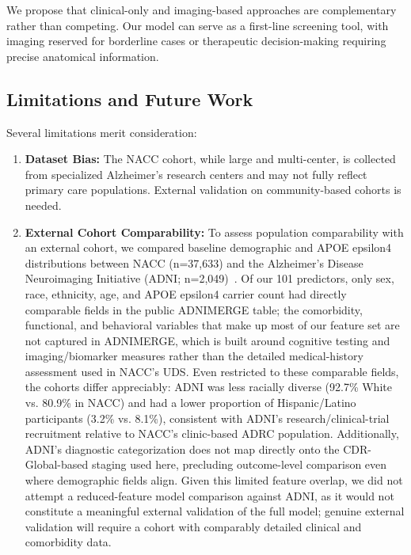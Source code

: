 \documentclass[preprint,12pt]{elsarticle}
\begin{document}
We propose that clinical-only and imaging-based approaches are complementary rather than competing. Our model can serve as a first-line screening tool, with imaging reserved for borderline cases or therapeutic decision-making requiring precise anatomical information.

\subsection{Limitations and Future Work}

Several limitations merit consideration:

\begin{enumerate}
    \item \textbf{Dataset Bias:} The NACC cohort, while large and multi-center, is collected from specialized Alzheimer's research centers and may not fully reflect primary care populations. External validation on community-based cohorts is needed.

    \item \textbf{External Cohort Comparability:} To assess population comparability with an external cohort, we compared baseline demographic and APOE epsilon4 distributions between NACC (n=37,633) and the Alzheimer's Disease Neuroimaging Initiative (ADNI; n=2,049)~\cite{petersen2010,aisen2024}. Of our 101 predictors, only sex, race, ethnicity, age, and APOE epsilon4 carrier count had directly comparable fields in the public ADNIMERGE table; the comorbidity, functional, and behavioral variables that make up most of our feature set are not captured in ADNIMERGE, which is built around cognitive testing and imaging/biomarker measures rather than the detailed medical-history assessment used in NACC's UDS. Even restricted to these comparable fields, the cohorts differ appreciably: ADNI was less racially diverse (92.7\% White vs. 80.9\% in NACC) and had a lower proportion of Hispanic/Latino participants (3.2\% vs. 8.1\%), consistent with ADNI's research/clinical-trial recruitment relative to NACC's clinic-based ADRC population. Additionally, ADNI's diagnostic categorization does not map directly onto the CDR-Global-based staging used here, precluding outcome-level comparison even where demographic fields align. Given this limited feature overlap, we did not attempt a reduced-feature model comparison against ADNI, as it would not constitute a meaningful external validation of the full model; genuine external validation will require a cohort with comparably detailed clinical and comorbidity data.


\end{enumerate}
\end{document}
